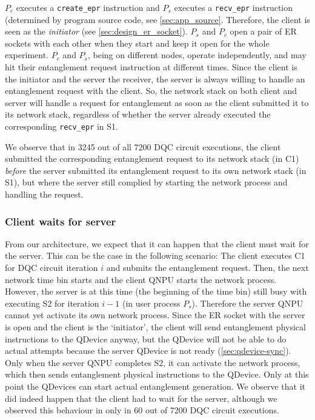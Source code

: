 $P_c$ executes a \texttt{create\_epr} instruction and $P_s$ executes a \texttt{recv\_epr} instruction (determined by program source code, see \cref{sec:app_source}. Therefore, the client is seen as the \emph{initiator} (see \cref{sec:design_er_socket}). $P_s$ and $P_c$ open a pair of \ac{ER} sockets with each other when they start and keep it open for the whole experiment. $P_c$ and $P_s$, being on different nodes, operate independently, and may hit their entanglement request instruction at different times. Since the client is the initiator and the server the receiver, the server is always willing to handle an entanglement request with the client. So, the network stack on both client and server will handle a request for entanglement as soon as the client submitted it to its network stack, regardless of whether the server already executed the corresponding \texttt{recv\_epr} in S1.

We observe that in 3245 out of all 7200 \ac{DQC} circuit executions, the client submitted the corresponding entanglement request to its network stack (in C1) \textit{before} the server submitted its entanglement request to its own network stack (in S1), but where the server still complied by starting the network process and handling the request.

\subsubsection{Client waits for server}

From our architecture, we expect that it can happen that the client must wait for the server. This can be the case in the following scenario: The client executes C1 for \ac{DQC} circuit iteration $i$ and submits the entanglement request. Then, the next network time bin starts and the client \ac{QNPU} starts the network process. However, the server is at this time (the beginning of the time bin) still busy with executing S2 for iteration $i-1$ (in user process $P_s$). Therefore the server \ac{QNPU} cannot yet activate its own network process. Since the \ac{ER} socket with the server is open and the client is the `initiator', the client will send entanglement physical instructions to the \ac{QDevice} anyway, but the \ac{QDevice} will not be able to do actual attempts because the server \ac{QDevice} is not ready (\cref{sec:qdevice-sync}). Only when the server \ac{QNPU} completes S2, it can activate the network process, which then sends entanglement physical instructions to the \ac{QDevice}. Only at this point the \acp{QDevice} can start actual entanglement generation. We observe that it did indeed happen that the client had to wait for the server, although we observed this behaviour in only in 60 out of 7200 \ac{DQC} circuit executions.

